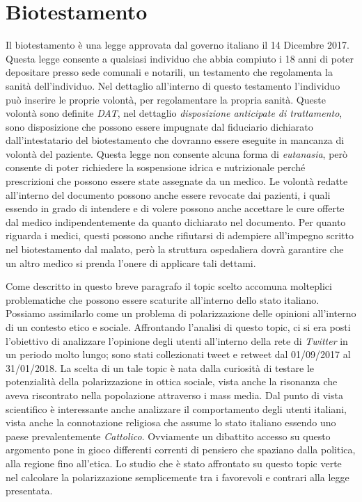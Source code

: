 \section{Biotestamento}
Il biotestamento è una legge approvata dal governo italiano il 14 Dicembre 2017. Questa legge consente a qualsiasi individuo che abbia compiuto i 18 anni di poter depositare presso sede comunali e notarili, un testamento che regolamenta la sanità dell'individuo. Nel dettaglio all'interno di questo testamento l'individuo può inserire le proprie volontà, per regolamentare la propria sanità. Queste volontà sono definite \textit{DAT}, nel dettaglio 		\textit{disposizione anticipate di trattamento}, sono disposizione che possono essere impugnate dal fiduciario dichiarato dall'intestatario del biotestamento che dovranno essere eseguite in mancanza di volontà del paziente.
Questa legge non consente alcuna forma di \textit{eutanasia}, però consente di poter richiedere la sospensione idrica e nutrizionale perché prescrizioni che possono essere state assegnate da un medico. Le volontà redatte all'interno del documento possono anche essere revocate dai pazienti, i quali essendo in grado di intendere e di volere possono anche accettare le cure offerte dal medico indipendentemente da quanto dichiarato nel documento. Per quanto riguarda i medici, questi possono anche rifiutarsi di adempiere all'impegno scritto nel biotestamento dal malato, però la struttura ospedaliera dovrà garantire che un altro medico si prenda l'onere di applicare tali dettami.

Come descritto in questo breve paragrafo il topic scelto accomuna molteplici problematiche che possono essere scaturite all'interno dello stato italiano. Possiamo assimilarlo come un problema di polarizzazione delle opinioni all'interno di un contesto etico e sociale.
Affrontando l'analisi di questo topic, ci si era posti l'obiettivo di analizzare l'opinione degli utenti all'interno della rete di \textit{Twitter} in un periodo molto lungo; sono stati collezionati tweet e retweet dal 01/09/2017 al 31/01/2018.
La scelta di un tale topic è nata dalla curiosità di testare le potenzialità della polarizzazione in ottica sociale, vista anche la risonanza che aveva riscontrato nella popolazione attraverso i mass media. Dal punto di vista scientifico è interessante anche analizzare il comportamento degli utenti italiani, vista anche la connotazione religiosa che assume lo stato italiano essendo uno paese prevalentemente \textit{Cattolico}. Ovviamente un dibattito accesso su questo argomento pone in gioco differenti correnti di pensiero che spaziano dalla politica, alla regione fino all'etica. 
Lo studio che è stato affrontato su questo topic verte nel calcolare la polarizzazione semplicemente tra i favorevoli e contrari alla legge presentata.

